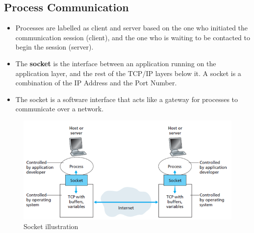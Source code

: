 \documentclass{article}
\theoremstyle{plain}
\theoremstyle{definition}
\begin{document}
\subsection{Process Communication}
\begin{itemize}
    \item Processes are labelled as client and server based on the one who initiated the communication session (client), and the one who is waiting to be contacted to begin the session (server). 
    
    \item The \textbf{socket} is the interface between an application running on the application layer, and the rest of the TCP/IP layers below it. A socket is a combination of the IP Address and the Port Number. 
    
    \item The socket is a software interface that acts like a gateway for processes to communicate over a network. 
    
\end{itemize}
\begin{figure}[!h]
    \centering
    \includegraphics[scale=0.9]{cn1.png}
    \caption{Socket illustration}
    \label{fig:my_label}
\end{figure}
\end{document}
